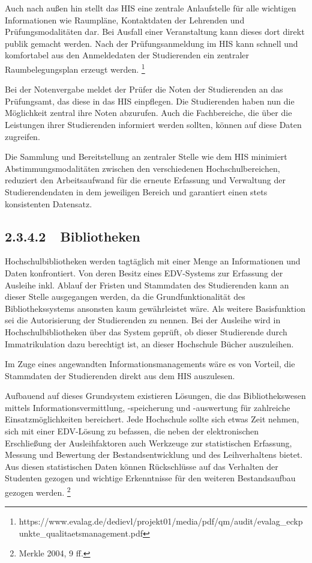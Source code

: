 \documentclass{article}
\begin{document}
\bigskip

Auch nach außen hin stellt das HIS eine zentrale Anlaufstelle für alle wichtigen Informationen wie Raumpläne,
Kontaktdaten der Lehrenden und Prüfungsmodalitäten dar. Bei Ausfall einer Veranstaltung kann dieses dort direkt publik
gemacht werden. Nach der Prüfungsanmeldung im HIS kann schnell und komfortabel aus den Anmeldedaten der Studierenden
ein zentraler Raumbelegungsplan erzeugt werden.
\footnote{https://www.evalag.de/dedievl/projekt01/media/pdf/qm/audit/evalag\_eckpunkte\_qualitaetsmanagement.pdf} 


\bigskip

Bei der Notenvergabe meldet der Prüfer die Noten der Studierenden an das Prüfungsamt, das diese in das HIS einpflegen.
Die Studierenden haben nun die Möglichkeit zentral ihre Noten abzurufen. Auch die Fachbereiche, die über die Leistungen
ihrer Studierenden informiert werden sollten, können auf diese Daten zugreifen. 


\bigskip

Die Sammlung und Bereitstellung an zentraler Stelle wie dem HIS minimiert Abstimmungsmodalitäten zwischen den
verschiedenen Hochschulbereichen, reduziert den Arbeitsaufwand für die erneute Erfassung und Verwaltung der
Studierendendaten in dem jeweiligen Bereich und garantiert einen stets konsistenten Datensatz. 

\subsection[2.3.4.2\ \ Bibliotheken]{2.3.4.2\ \ Bibliotheken}
Hochschulbibliotheken werden tagtäglich mit einer Menge an Informationen und Daten konfrontiert. Von deren Besitz eines
EDV-Systems zur Erfassung der Ausleihe inkl. Ablauf der Fristen und Stammdaten des Studierenden kann an dieser Stelle
ausgegangen werden, da die Grundfunktionalität des Bibliothekssystems ansonsten kaum gewährleistet wäre. Als weitere
Basisfunktion sei die Autorisierung der Studierenden zu nennen. Bei der Ausleihe wird in Hochschulbibliotheken über das
System geprüft, ob dieser Studierende durch Immatrikulation dazu berechtigt ist, an dieser Hochschule Bücher
auszuleihen. 

Im Zuge eines angewandten Informationsmanagements wäre es von Vorteil, die Stammdaten der Studierenden direkt aus dem
HIS auszulesen. 


\bigskip

Aufbauend auf dieses Grundsystem existieren Lösungen, die das Bibliothekswesen mittels Informationsvermittlung,
-speicherung und -auswertung für zahlreiche Einsatzmöglichkeiten bereichert. Jede Hochschule sollte sich etwas Zeit
nehmen, sich mit einer EDV-Lösung zu befassen, die neben der elektronischen Erschließung der Ausleihfaktoren auch
Werkzeuge zur statistischen Erfassung, Messung und Bewertung der Bestandsentwicklung und des Leihverhaltens bietet. Aus
diesen statistischen Daten können Rückschlüsse auf das Verhalten der Studenten gezogen und wichtige Erkenntnisse für
den weiteren Bestandsaufbau gezogen werden. \footnote{Merkle 2004, 9 ff.}
\end{document}
